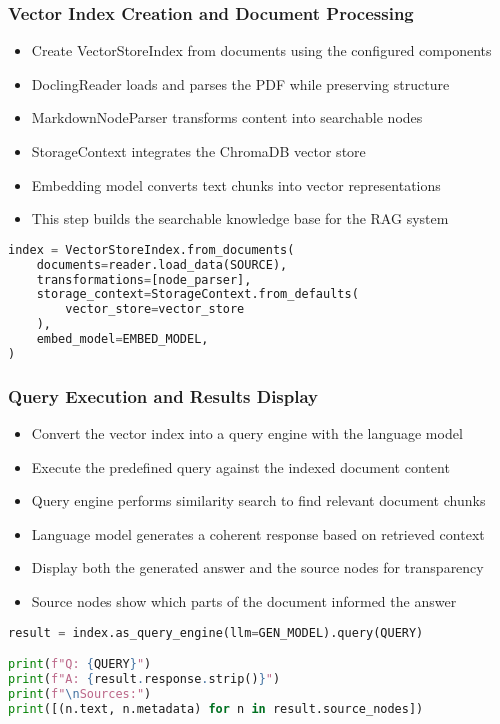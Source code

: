 \begin{frame}[fragile]\frametitle{Vector Index Creation and Document Processing}
      \begin{itemize}
          \item Create VectorStoreIndex from documents using the configured components
          \item DoclingReader loads and parses the PDF while preserving structure
          \item MarkdownNodeParser transforms content into searchable nodes
          \item StorageContext integrates the ChromaDB vector store
          \item Embedding model converts text chunks into vector representations
          \item This step builds the searchable knowledge base for the RAG system
      \end{itemize}
      
\begin{lstlisting}[language=Python, basicstyle=\tiny]
index = VectorStoreIndex.from_documents(
    documents=reader.load_data(SOURCE),
    transformations=[node_parser],
    storage_context=StorageContext.from_defaults(
        vector_store=vector_store
    ),
    embed_model=EMBED_MODEL,
)
\end{lstlisting}
\end{frame}

\begin{frame}[fragile]\frametitle{Query Execution and Results Display}
      \begin{itemize}
          \item Convert the vector index into a query engine with the language model
          \item Execute the predefined query against the indexed document content
          \item Query engine performs similarity search to find relevant document chunks
          \item Language model generates a coherent response based on retrieved context
          \item Display both the generated answer and the source nodes for transparency
          \item Source nodes show which parts of the document informed the answer
      \end{itemize}
      
\begin{lstlisting}[language=Python, basicstyle=\tiny]
result = index.as_query_engine(llm=GEN_MODEL).query(QUERY)

print(f"Q: {QUERY}")
print(f"A: {result.response.strip()}")
print(f"\nSources:")
print([(n.text, n.metadata) for n in result.source_nodes])
\end{lstlisting}
\end{frame}

